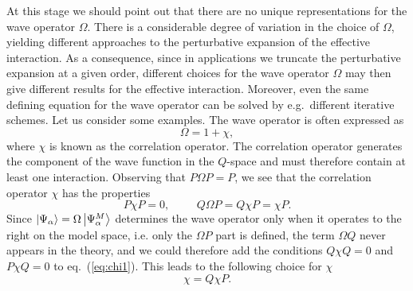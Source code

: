 At this stage we should point out that there are no unique representations
for the wave operator $\Omega$. There is a considerable degree of variation
in the choice of $\Omega$, yielding different approaches to the perturbative
expansion of the effective interaction. As a consequence,
since in applications we truncate the perturbative expansion at a given
order, different choices for the wave operator $\Omega$ may then give
different results for the effective interaction. Moreover, even the same
defining equation for the wave operator can be solved by e.g.\
different iterative schemes. Let us consider some examples.
The wave operator is often expressed as
\begin{equation}
  \Omega = 1 +\chi,
\end{equation}
where $\chi$ is known as the correlation operator. The correlation
operator generates the component of the wave function in the $Q$-space
and must therefore contain at least one interaction. Observing
that $P\Omega P = P$, we see that the correlation operator $\chi$
has the properties
\begin{equation}
   P\chi P = 0, \hspace{1cm} Q\Omega P = Q\chi P =\chi P. \label{eq:chi1}
\end{equation}
Since  
$\left| \Psi_{\alpha} \right\rangle=\Omega\left| \Psi_{\alpha}^{M} \right\rangle$ determines the wave operator
only when it operates to the right on the model space, i.e. only the
$\Omega P$  part is defined, the term $\Omega Q$
never appears in the theory,
and we could therefore add the conditions $Q\chi Q =0$ and $P\chi Q =0$
to eq.\ (\ref{eq:chi1}). This leads to the following choice for $\chi$
\begin{equation}
   \chi = Q\chi P. \label{eq:chi2}
\end{equation}

